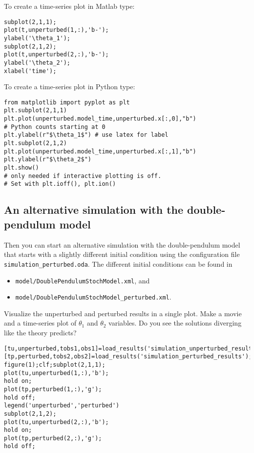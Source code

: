 \ifshowmatlab
To create a time-series plot in Matlab type:
\begin{lstlisting}[style=MatlabStyle,frame=single,caption={Matlab}]
subplot(2,1,1);
plot(t,unperturbed(1,:),'b-');
ylabel('\theta_1');
subplot(2,1,2);
plot(t,unperturbed(2,:),'b-');
ylabel('\theta_2');
xlabel('time');
\end{lstlisting}
\fi
      
To create a time-series plot in Python type:
\begin{lstlisting}[style=PythonStyle,caption={Python}]
from matplotlib import pyplot as plt
plt.subplot(2,1,1)
plt.plot(unperturbed.model_time,unperturbed.x[:,0],"b") 
# Python counts starting at 0
plt.ylabel(r"$\theta_1$") # use latex for label
plt.subplot(2,1,2)
plt.plot(unperturbed.model_time,unperturbed.x[:,1],"b")
plt.ylabel(r"$\theta_2$")
plt.show() 
# only needed if interactive plotting is off. 
# Set with plt.ioff(), plt.ion()
\end{lstlisting}
%
\subsection{An alternative simulation with the double-pendulum model}

Then you can start an alternative simulation with the double-pendulum model that
starts with a slightly different initial condition using the
configuration file \texttt{ simulation\_perturbed.oda}. The different initial conditions
can be found in 
\begin{itemize}
 \item {\texttt{model/DoublePendulumStochModel.xml}}, and 
 \item {\texttt{model/DoublePendulumStochModel\_perturbed.xml}}.
\end{itemize}

Visualize the unperturbed and perturbed results in a single plot. Make
       a movie and a time-series plot of $\theta_1$ and $\theta_2$ variables. Do you see
       the solutions diverging like the theory predicts?
       
\ifshowmatlab
\begin{lstlisting}[style=MatlabStyle, caption={Matlab}]
[tu,unperturbed,tobs1,obs1]=load_results('simulation_unperturbed_results');
[tp,perturbed,tobs2,obs2]=load_results('simulation_perturbed_results');
figure(1);clf;subplot(2,1,1);
plot(tu,unperturbed(1,:),'b');
hold on;
plot(tp,perturbed(1,:),'g');
hold off;
legend('unperturbed','perturbed')
subplot(2,1,2);
plot(tu,unperturbed(2,:),'b');
hold on;
plot(tp,perturbed(2,:),'g');
hold off;\end{lstlisting}
\fi
      
